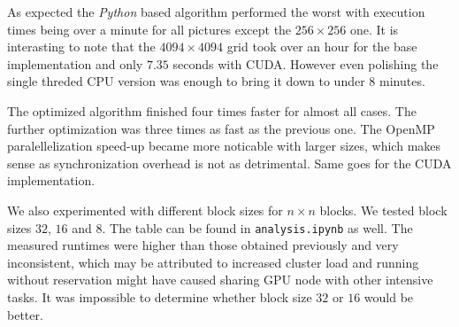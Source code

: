 \documentclass[11pt]{article}
\begin{document}
As expected the \textit{Python} based algorithm performed the worst with execution times being over a minute for all pictures except the $256\times 256$ one. It is interasting to note that the $4094\times4094$ grid took over an hour for the base implementation and only $7.35$ seconds with CUDA. However even polishing the single threded CPU version was enough to bring it down to under $8$ minutes. 

The optimized algorithm finished four times faster for almost all cases. The further optimization was three times as fast as the previous one. The OpenMP paralellelization speed-up became more noticable with larger sizes, which makes sense as synchronization overhead is not as detrimental. Same goes for the CUDA implementation. 

We also experimented with different block sizes for $n\times n$ blocks. We tested block sizes $32$, $16$ and $8$. The table can be found in \texttt{analysis.ipynb} as well. The measured runtimes were higher than those obtained previously and very inconsistent, which may be attributed to increased cluster load and running without reservation might have caused sharing GPU node with other intensive tasks. It was impossible to determine whether block size $32$ or $16$ would be better. 
\end{document}
